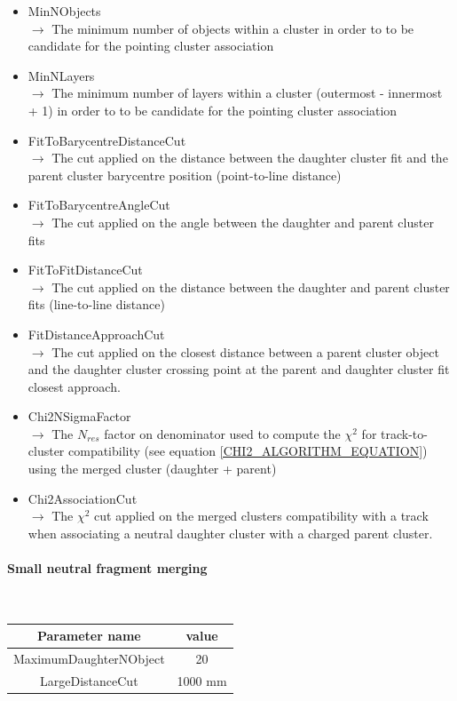 \documentclass[cits]{JINST}
\begin{document}
\begin{itemize}
  \item MinNObjects \\
  $\rightarrow$ The minimum number of objects within a cluster in order to to be candidate for the pointing cluster association
  \item MinNLayers \\
  $\rightarrow$ The minimum number of layers within a cluster (outermost - innermost + 1) in order to to be candidate for the pointing cluster association
  \item FitToBarycentreDistanceCut \\
  $\rightarrow$ The cut applied on the distance between the daughter cluster fit and the parent cluster barycentre position (point-to-line distance)
  \item FitToBarycentreAngleCut \\
  $\rightarrow$ The cut applied on the angle between the daughter and parent cluster fits
  \item FitToFitDistanceCut \\
  $\rightarrow$ The cut applied on the distance between the daughter and parent cluster fits (line-to-line distance)
  \item FitDistanceApproachCut \\
  $\rightarrow$ The cut applied on the closest distance between a parent cluster object and the daughter cluster crossing point at the parent and daughter cluster fit closest approach.
  \item Chi2NSigmaFactor \\
  $\rightarrow$ The $N_{res}$ factor on denominator used to compute the $\chi^2$ for track-to-cluster compatibility (see equation \ref{CHI2_ALGORITHM_EQUATION}) using the merged cluster (daughter + parent)
  \item Chi2AssociationCut \\
  $\rightarrow$ The $\chi^2$ cut applied on the merged clusters compatibility with a track when associating a neutral daughter cluster with a charged parent cluster.
\end{itemize}


\paragraph{Small neutral fragment merging} ~

\begin{table}[!ht]
  \begin{center}
    \begin{tabu} to \linewidth { c | c } 
          Parameter name & value \\
          \hline
          MaximumDaughterNObject & 20 \\
          LargeDistanceCut & 1000 mm
    \end{tabu}
  \end{center}
\end{table}
\end{document}
